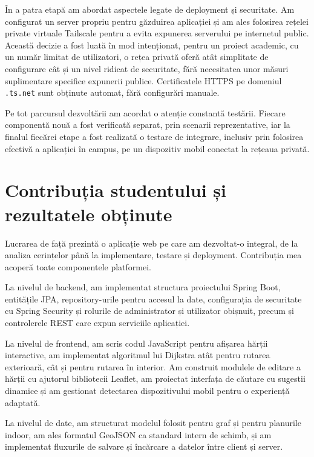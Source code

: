 ﻿\documentclass[12pt, a4paper, twoside, romanian]{teza-upb}
\begin{document}
În a patra etapă am abordat aspectele legate de deployment și securitate.
Am configurat un server propriu pentru găzduirea aplicației și am ales
folosirea rețelei private virtuale Tailscale pentru a evita expunerea
serverului pe internetul public. Această decizie a fost luată în mod
intenționat, pentru un proiect academic, cu un număr limitat de utilizatori,
o rețea privată oferă atât simplitate de configurare cât și un nivel ridicat
de securitate, fără necesitatea unor măsuri suplimentare specifice expunerii
publice. Certificatele HTTPS pe domeniul \texttt{.ts.net} sunt obținute
automat, fără configurări manuale.
 
Pe tot parcursul dezvoltării am acordat o atenție constantă testării.
Fiecare componentă nouă a fost verificată separat, prin scenarii reprezentative,
iar la finalul fiecărei etape a fost realizată o testare de integrare,
inclusiv prin folosirea efectivă a aplicației în campus, pe un dispozitiv
mobil conectat la rețeaua privată.
 
\section{Contribuția studentului și rezultatele obținute}
\label{sec:intro-contributie}
 
Lucrarea de față prezintă o aplicație web pe care am dezvoltat-o integral,
de la analiza cerințelor până la implementare, testare și deployment.
Contribuția mea acoperă toate componentele platformei.
 
La nivelul de backend, am implementat structura proiectului Spring Boot,
entitățile JPA, repository-urile pentru accesul la date, configurația de
securitate cu Spring Security și rolurile de administrator și utilizator
obișnuit, precum și controlerele REST care expun serviciile aplicației.
 
La nivelul de frontend, am scris codul JavaScript pentru afișarea hărții
interactive, am implementat algoritmul lui Dijkstra atât pentru rutarea
exterioară, cât și pentru rutarea în interior. Am construit modulele de
editare a hărții cu ajutorul bibliotecii Leaflet, am proiectat interfața
de căutare cu sugestii dinamice și am gestionat detectarea dispozitivului
mobil pentru o experiență adaptată.
 
La nivelul de date, am structurat modelul folosit pentru graf și pentru
planurile indoor, am ales formatul GeoJSON ca standard intern de schimb,
și am implementat fluxurile de salvare și încărcare a datelor între
client și server.
 
\end{document}
